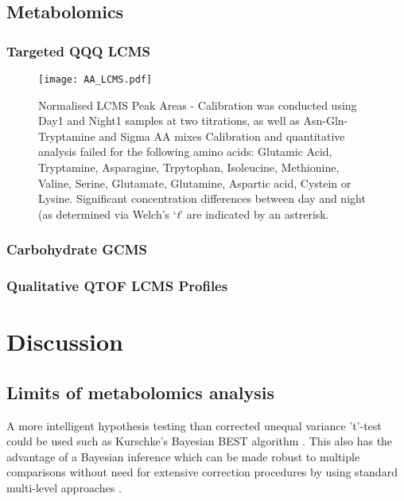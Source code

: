 \subsection{Metabolomics} 

\subsubsection{Targeted QQQ LCMS}

\begin{figure}
    \texttt{[image: AA\_LCMS.pdf]}
    \caption{Normalised LCMS Peak Areas - 
        Calibration was conducted using Day1 and Night1 samples at two titrations, as well as Asn-Gln-Tryptamine and Sigma AA mixes
    Calibration and quantitative analysis failed for the following amino acids: 
Glutamic Acid, Tryptamine, Asparagine, Trpytophan, Isoleucine, Methionine, Valine, Serine, Glutamate, Glutamine, Aspartic acid, Cystein or Lysine.
Significant concentration differences between day and night (as determined via Welch's `\textit{t}' are indicated by an astrerisk.}
    \label{fig:aa_lcms}
\end{figure}

\subsubsection{Carbohydrate GCMS}


\subsubsection{Qualitative QTOF LCMS Profiles}


\section{Discussion}

\subsection{Limits of metabolomics analysis}

A more intelligent hypothesis testing than corrected unequal variance 't'-test
could be used such as Kurschke's Bayesian BEST algorithm \citep{Kruschke2013}.
This also has the advantage of a Bayesian inference which can be 
made robust to multiple comparisons without need for extensive correction
procedures by using standard multi-level approaches \citep{Gelman2009}.





